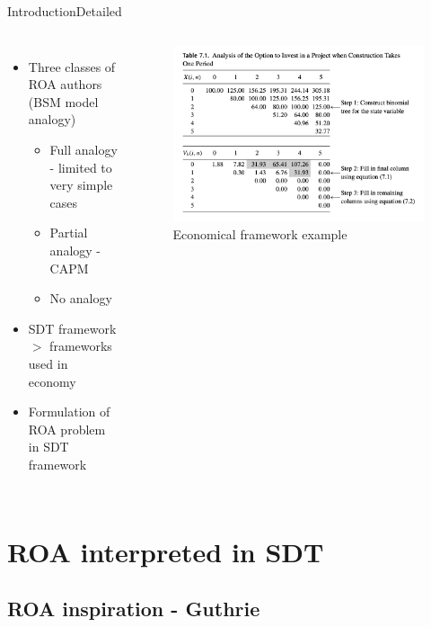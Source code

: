\documentclass[us]{beamer}
\begin{document}
\begin{frame}{Introduction}{Detailed}

\begin{columns}
	\begin{itemize}
		\item {Three classes of ROA authors (BSM model analogy)}
		\begin{itemize}
			\item{Full analogy - limited to very simple cases}
			\item{Partial analogy - CAPM}
			\item {No analogy }
		\end{itemize}
		\item {SDT framework $>$ frameworks used in economy}
		\item {Formulation of ROA problem in SDT framework}
	\end{itemize}	
	\begin{figure}
		\includegraphics[scale=0.35]{Guthrie.png}
		\caption{Economical framework example \cite{Gut:09}}
	\end{figure}
\end{columns}	

\end{frame}




\section{ROA interpreted in SDT}

\subsection{ROA inspiration - Guthrie}
\end{document}
